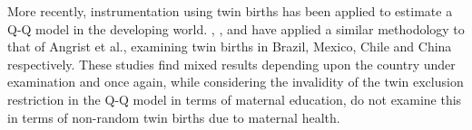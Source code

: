 More recently, instrumentation using twin births has been applied to estimate a Q-Q model in the developing world. \cite{SouzaPonczek2012}, 
\cite{FitzsimonsMalde2010}, \citet{Sanhueza2009} and \citet{Lietal2008} have applied a similar methodology to that of Angrist et al., 
examining twin births in Brazil, Mexico, Chile and China respectively.  These studies find mixed results depending upon the country under 
examination and once again, while considering the invalidity of the twin exclusion restriction in the Q-Q model in terms of maternal education, 
do not examine this in terms of non-random twin births due to maternal health. 
